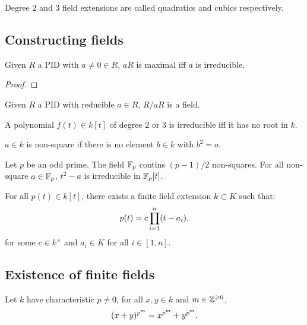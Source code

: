 \documentclass[../Year2.tex]{subfiles}
\begin{document}
\begin{remark}
    Degree $2$ and $3$ field extensions are called quadratics and cubics respectively.
\end{remark}

\subsection{Constructing fields}

\begin{lemma}
    Given $R$ a PID with $a\neq0\in R$, $aR$ is maximal iff $a$ is irreducible.
    \begin{proof}
        
    \end{proof}
\end{lemma}

\begin{corollary}
    Given $R$ a PID with reducible $a\in R$, $R/aR$ is a field.
\end{corollary}

\begin{theorem}
    A polynomial $f(t)\in k[t]$ of degree $2$ or $3$ is irreducible iff it has no root in $k$.
\end{theorem}

\begin{definition}
    $a\in k$ is non-square if there is no element $b\in k$ with $b^2=a$.
\end{definition}

\begin{lemma}
    Let $p$ be an odd prime. The field $\mathbb{F}_p$ contins $(p-1)/2$ non-squares. For all non-square $a\in\mathbb{F}_p$, $t^2-a$ is irreducible in $\mathbb{F}_p[t]$.
\end{lemma}

\begin{theorem}
    For all $p(t)\in k[t]$, there exists a finite field extension $k\subset K$ such that: \[
        p(t)=c\prod_{i=1}^n(t-a_i)
        \text{\textcolor{black}{,}}
    \] for some $c\in k^\times$ and $a_i\in K$ for all $i\in[1,n]$.
\end{theorem}

\subsection{Existence of finite fields}

\begin{theorem}
    Let $k$ have characteristic $p\neq 0$, for all $x,y\in k$ and $m\in\mathbb{Z}^{\geq 0}$, \[
        (x+y)^{p^m}=x^{p^m}+y^{p^m}
        \text{\textcolor{black}{.}}
    \]
\end{theorem}
\end{document}
